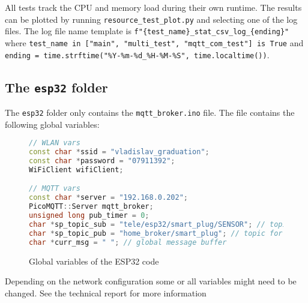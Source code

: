 \begin{appendices}
All tests track the CPU and memory load during their own runtime. The results can be plotted by running \lstinline{resource_test_plot.py} and selecting one of the log files. The log file name template is \lstinline|f"{test_name}_stat_csv_log_{ending}"| where \lstinline{test_name in ["main", "multi_test", "mqtt_com_test"] is True} and \lstinline{ending = time.strftime("%Y-%m-%d_%H-%M-%S", time.localtime())}.

\subsection{The \lstinline{esp32} folder}
The \lstinline{esp32} folder only contains the \lstinline{mqtt_broker.ino} file. The file contains the following global variables:

\begin{figure}
    \centering
    \begin{lstlisting}[language=ino,firstnumber=1]
// WLAN vars
const char *ssid = "vladislav_graduation";
const char *password = "07911392";
WiFiClient wifiClient;

// MQTT vars
const char *server = "192.168.0.202";
PicoMQTT::Server mqtt_broker;
unsigned long pub_timer = 0;
char *sp_topic_sub = "tele/esp32/smart_plug/SENSOR"; // topic for communication with smart plug
char *sp_topic_pub = "home_broker/smart_plug"; // topic for sending sp data to client(s)
char *curr_msg = " "; // global message buffer
    \end{lstlisting}
    \caption{Global variables of the ESP32 code}
    \label{fig:global_vars}
\end{figure}


Depending on the network configuration some or all variables might need to be changed. See the technical report for more information

\end{appendices}